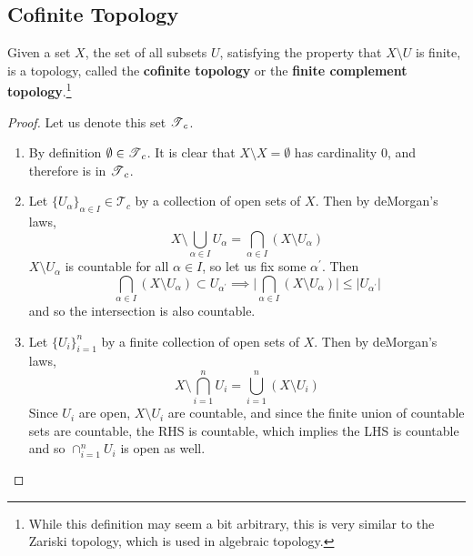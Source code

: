 \subsection{Cofinite Topology}

  \begin{definition}
    Given a set $X$, the set of all subsets $U$, satisfying the property that $X \setminus U$ is finite, is a topology, called the \textbf{cofinite topology} or the \textbf{finite complement topology}.\footnote{While this definition may seem a bit arbitrary, this is very similar to the Zariski topology, which is used in algebraic topology.} 
  \end{definition}
  \begin{proof}
    Let us denote this set $\T_c$. 
    \begin{enumerate}
      \item By definition $\emptyset \in \T_c$. It is clear that $X \setminus X = \emptyset$ has cardinality $0$, and therefore is in $\T_c$. 

      \item Let $\{U_\alpha\}_{\alpha \in I} \in \mathcal{T}_c$ by a collection of open sets of $X$. Then by deMorgan's laws, 
      \begin{equation}
        X \setminus \bigcup_{\alpha \in I} U_{\alpha} = \bigcap_{\alpha \in I} (X \setminus U_\alpha)
      \end{equation}
      $X \setminus U_\alpha$ is countable for all $\alpha \in I$, so let us fix some $\alpha^\prime$. Then 
      \begin{equation}
        \bigcap_{\alpha \in I} (X \setminus U_\alpha) \subset U_{\alpha^\prime} \implies \bigg| \bigcap_{\alpha \in I} (X \setminus U_\alpha) \bigg| \leq \big| U_{\alpha^\prime} \big| 
      \end{equation}
      and so the intersection is also countable. 

      \item Let $\{U_i\}_{i=1}^n$ by a finite collection of open sets of $X$. Then by deMorgan's laws, 
      \begin{equation}
        X \setminus \bigcap_{i=1}^n U_i = \bigcup_{i=1}^n (X \setminus U_i)
      \end{equation}
      Since $U_i$ are open, $X \setminus U_i$ are countable, and since the finite union of countable sets are countable, the RHS is countable, which implies the LHS is countable and so $\cap_{i=1}^n U_i$ is open as well. 
    \end{enumerate}
  \end{proof} 

